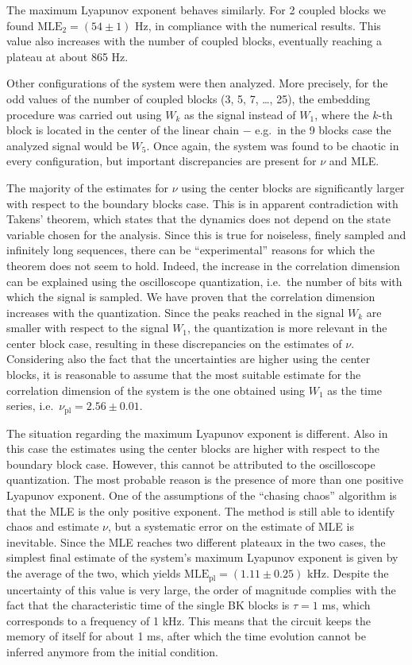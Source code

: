 The maximum Lyapunov exponent behaves similarly. For 2 coupled blocks we found $\text{MLE}_2=(54\pm1)$
Hz, in compliance with the numerical results. This value also increases with the number of coupled
blocks, eventually reaching a plateau at about 865 Hz.

Other configurations of the system were then analyzed. More precisely, for the odd values of the
number of coupled blocks (3, 5, 7, \ldots, 25), the embedding procedure was carried out using
$W_k$ as the signal instead of $W_1$, where the $k$-th block is located in the center of the linear
chain $-$ e.g.\ in the 9 blocks case the analyzed signal would be $W_5$. Once again, the system was
found to be chaotic in every configuration, but important discrepancies are present for $\nu$ and MLE\@.

The majority of the estimates for $\nu$ using the center blocks are significantly larger with respect
to the boundary blocks case. This is in apparent contradiction with Takens' theorem, which states that
the dynamics does not depend on the state variable chosen for the analysis. Since this is true for
noiseless, finely sampled and infinitely long sequences, there can be ``experimental'' reasons for
which the theorem does not seem to hold. Indeed, the increase in the correlation dimension can be
explained using the oscilloscope quantization, i.e.\ the number of bits with which the signal is sampled.
We have proven that the correlation dimension increases with the quantization. Since the peaks
reached in the signal $W_k$ are smaller with respect to the signal $W_1$, the quantization is more
relevant in the center block case, resulting in these discrepancies on the estimates of $\nu$.
Considering also the fact that the uncertainties are higher using the center blocks, it is reasonable
to assume that the most suitable estimate for the correlation dimension of the system is the one
obtained using $W_1$ as the time series, i.e.\ $\nu_{\text{pl}}=2.56\pm0.01$.

The situation regarding the maximum Lyapunov exponent is different. Also in this case the estimates using
the center blocks are higher with respect to the boundary block case. However, this cannot be
attributed to the oscilloscope quantization. The most probable reason is the presence of more than
one positive Lyapunov exponent. One of the assumptions of the ``chasing chaos'' algorithm is that
the MLE is the only positive exponent. The method is still able to identify chaos and estimate $\nu$,
but a systematic error on the estimate of MLE is inevitable. Since the MLE reaches two different
plateaux in the two cases, the simplest final estimate of the system's maximum Lyapunov exponent
is given by the average of the two, which yields $\text{MLE}_{\text{pl}}=(1.11\pm0.25)$ kHz. Despite
the uncertainty of this value is very large, the order of magnitude complies with the fact that the
characteristic time of the single BK blocks is $\tau=1$ ms, which corresponds to a frequency of 1 kHz.
This means that the circuit keeps the memory of itself for about 1 ms, after which the time evolution
cannot be inferred anymore from the initial condition.

